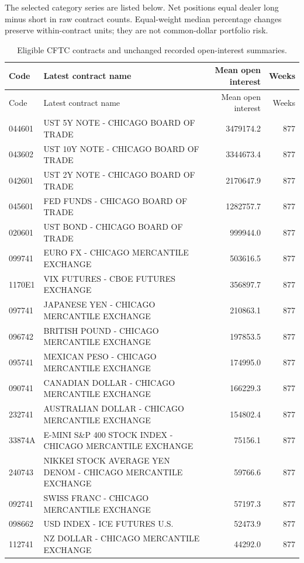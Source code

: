\documentclass[10pt,a4paper]{article}
\begin{document}
The selected category series are listed below. Net positions equal dealer long minus short in raw contract counts. Equal-weight median percentage changes preserve within-contract units; they are not common-dollar portfolio risk.
\begin{center}\scriptsize\begin{longtable}{lp{7.1cm}rr}
\caption{Eligible CFTC contracts and unchanged recorded open-interest summaries.}\label{tab:cftc-source-inventory}\\
\toprule Code & Latest contract name & Mean open interest & Weeks \\\midrule\endfirsthead
\toprule Code & Latest contract name & Mean open interest & Weeks \\\midrule\endhead
044601 & UST 5Y NOTE - CHICAGO BOARD OF TRADE & 3479174.2 & 877 \\
043602 & UST 10Y NOTE - CHICAGO BOARD OF TRADE & 3344673.4 & 877 \\
042601 & UST 2Y NOTE - CHICAGO BOARD OF TRADE & 2170647.9 & 877 \\
045601 & FED FUNDS - CHICAGO BOARD OF TRADE & 1282757.7 & 877 \\
020601 & UST BOND - CHICAGO BOARD OF TRADE & 999944.0 & 877 \\
099741 & EURO FX - CHICAGO MERCANTILE EXCHANGE & 503616.5 & 877 \\
1170E1 & VIX FUTURES - CBOE FUTURES EXCHANGE & 356897.7 & 877 \\
097741 & JAPANESE YEN - CHICAGO MERCANTILE EXCHANGE & 210863.1 & 877 \\
096742 & BRITISH POUND - CHICAGO MERCANTILE EXCHANGE & 197853.5 & 877 \\
095741 & MEXICAN PESO - CHICAGO MERCANTILE EXCHANGE & 174995.0 & 877 \\
090741 & CANADIAN DOLLAR - CHICAGO MERCANTILE EXCHANGE & 166229.3 & 877 \\
232741 & AUSTRALIAN DOLLAR - CHICAGO MERCANTILE EXCHANGE & 154802.4 & 877 \\
33874A & E-MINI S\&P 400 STOCK INDEX - CHICAGO MERCANTILE EXCHANGE & 75156.1 & 877 \\
240743 & NIKKEI STOCK AVERAGE YEN DENOM - CHICAGO MERCANTILE EXCHANGE & 59766.6 & 877 \\
092741 & SWISS FRANC - CHICAGO MERCANTILE EXCHANGE & 57197.3 & 877 \\
098662 & USD INDEX - ICE FUTURES U.S. & 52473.9 & 877 \\
112741 & NZ DOLLAR - CHICAGO MERCANTILE EXCHANGE & 44292.0 & 877 \\
\bottomrule\end{longtable}\end{center}
\end{document}
